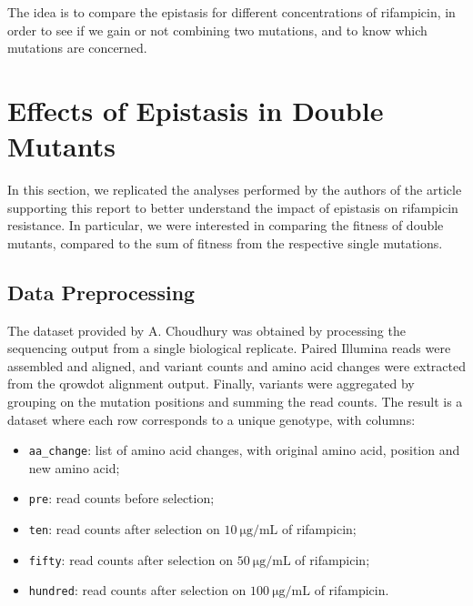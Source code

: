 \documentclass[12pt]{article}
\begin{document}
  The idea is to compare the epistasis for different concentrations of
  rifampicin, in order to see if we gain or not combining two mutations, and to
  know which mutations are concerned.

  \section{Effects of Epistasis in Double Mutants}

  In this section, we replicated the analyses performed by the authors of the
  article supporting this report to better understand the impact of epistasis
  on rifampicin resistance. In particular, we were interested in comparing the
  fitness of double mutants, compared to the sum of fitness from the respective
  single mutations.

  \subsection{Data Preprocessing}

  The dataset provided by A. Choudhury was obtained by processing the
  sequencing output from a single biological replicate. Paired Illumina reads
  were assembled and aligned, and variant counts and amino acid changes were
  extracted from the qrowdot alignment output. Finally, variants were
  aggregated by grouping on the mutation positions and summing the read counts.
  The result is a dataset where each row corresponds to a unique genotype, with
  columns:
  \begin{itemize}
    \item \lstinline{aa_change}: list of amino acid changes, with original
      amino acid, position and new amino acid;
    \item \lstinline{pre}: read counts before selection;
    \item \lstinline{ten}: read counts after selection on 
      $\SI{10}{\micro\gram\per\milli\liter}$ of rifampicin;
    \item \lstinline{fifty}: read counts after selection on 
      $\SI{50}{\micro\gram\per\milli\liter}$ of rifampicin; 
    \item \lstinline{hundred}: read counts after selection on 
      $\SI{100}{\micro\gram\per\milli\liter}$ of rifampicin. 
  \end{itemize}
\end{document}
